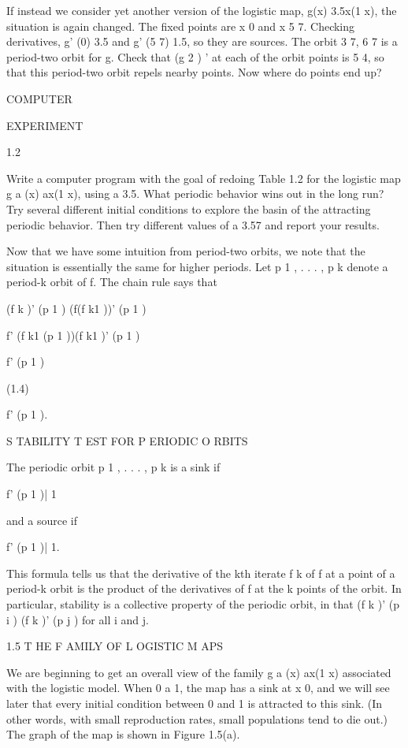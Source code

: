 \documentclass[12pt]{article}
\begin{document}
If instead we consider yet another version of the logistic map, g(x)  3.5x(1  x), the situation is again 
changed. The fixed points are x  0 and x  5  7. Checking derivatives, g' (0)  3.5 and g' (5  7)  1.5, so 
they are sources. The orbit 3  7, 6  7  is a period-two orbit for g. Check that (g 2 ) ' at each of the 
orbit points is 5  4, so that this period-two orbit repels nearby points. Now where do points end up?



COMPUTER

EXPERIMENT

1.2

Write a computer program with the goal of redoing Table 1.2 for the logistic map g a (x)  ax(1  x), using a  
3.5. What periodic behavior wins out in the long run? Try several different initial conditions to explore 
the basin of the attracting periodic behavior. Then try different values of a  3.57 and report your 
results.

Now that we have some intuition from period-two orbits, we note that the situation is essentially the same 
for higher periods. Let p 1 , . . . , p k  denote a period-k orbit of f. The chain rule says that

(f k )' (p 1 )  (f(f k1 ))' (p 1 )

 f' (f k1 (p 1 ))(f k1 )' (p 1 )

 f' (p 1 )

(1.4)

 f' (p 1 ).

S TABILITY T EST FOR P ERIODIC O RBITS

The periodic orbit p 1 , . . . , p k  is a sink if

 f' (p 1 )|  1

and a source if

 f' (p 1 )| 
 1.


This formula tells us that the derivative of the kth iterate f k of f at a point of a period-k orbit is the 
product of the derivatives of f at the k points of the orbit. In particular, stability is a collective 
property of the periodic orbit, in that (f k )' (p i )  (f k )' (p j ) for all i and j.

1.5 T HE F AMILY OF L OGISTIC M APS

We are beginning to get an overall view of the family g a (x)  ax(1  x) associated with the logistic model. 
When 0 a  1, the map has a sink at x  0, and we will see later that every initial condition between 0 and 1 
is attracted to this sink. (In other words, with small reproduction rates, small populations tend to die 
out.) The graph of the map is shown in Figure 1.5(a).
\end{document}
